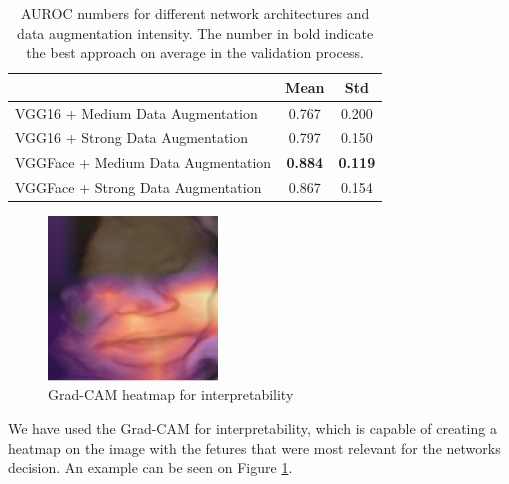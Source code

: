 \begin{table}[htbp]
\centering
\caption{AUROC numbers for different network architectures and data augmentation intensity. The number in bold indicate the best approach on average in the validation process.}
\label{tab:results}
\begin{tabular}{lcc}
\hline
\multicolumn{1}{c}{}               & Mean           & Std            \\ \hline
VGG16 + Medium Data Augmentation   & 0.767          & 0.200          \\
VGG16 + Strong Data Augmentation   & 0.797          & 0.150          \\
VGGFace + Medium Data Augmentation & \textbf{0.884} & \textbf{0.119} \\
VGGFace + Strong Data Augmentation & 0.867          & 0.154          \\ \hline
\end{tabular}
\end{table}

\begin{figure}[htbp]
    \centering
    \includegraphics[width=0.4\textwidth]{imgs/chap4_gradcam.png}
    \caption{Grad-CAM heatmap for interpretability}
    \label{fig:gradcam}
\end{figure}

We have used the Grad-CAM \citep{SelvarajuCDVPB17} for interpretability, which is capable of creating a heatmap on the image with the fetures that were most relevant for the networks decision. An example can be seen on Figure \ref{fig:gradcam}.


